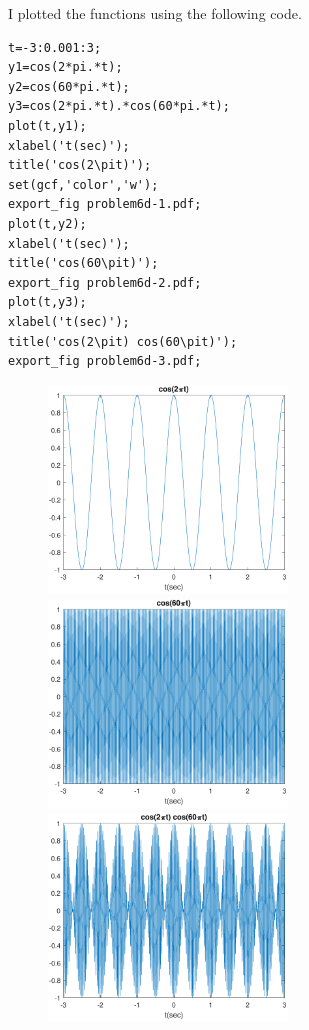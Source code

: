 \documentclass[12pt]{article}
\begin{document}
I plotted the functions using the following code.
\begin{verbatim}
t=-3:0.001:3;
y1=cos(2*pi.*t);
y2=cos(60*pi.*t);
y3=cos(2*pi.*t).*cos(60*pi.*t);
plot(t,y1);
xlabel('t(sec)');
title('cos(2\pit)');
set(gcf,'color','w');
export_fig problem6d-1.pdf;
plot(t,y2);
xlabel('t(sec)');
title('cos(60\pit)');
export_fig problem6d-2.pdf;
plot(t,y3);
xlabel('t(sec)');
title('cos(2\pit) cos(60\pit)');
export_fig problem6d-3.pdf;
\end{verbatim}
\begin{figure}[H]
    \begin{center}
        \includegraphics[width=2.5in]{problem6d-1.pdf}
        \includegraphics[width=2.5in]{problem6d-2.pdf}
        \includegraphics[width=2.5in]{problem6d-3.pdf}
    \end{center}
\end{figure}
\end{document}
